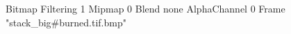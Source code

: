 {Bitmap
	{Filtering 1}
	{Mipmap 0}
	{Blend none}
	{AlphaChannel 0}
	{Frame "stack_big#burned.tif.bmp"}
}
